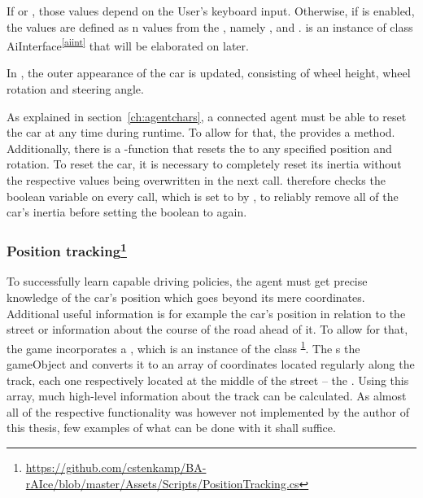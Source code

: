 If  or , those values depend on the User's keyboard input. Otherwise, if  is enabled, the values are defined as n values from the , namely ,  and .  is an instance of class AiInterface\textsuperscript{\ref{aiint}} that will be elaborated on later.

In , the outer appearance of the car is updated, consisting of wheel height, wheel rotation and steering angle.

As explained in section~\ref{ch:agentchars}, a connected agent must be able to reset the car at any time during runtime. To allow for that, the  provides a  method. Additionally, there is a -function that resets the  to any specified position and rotation. To reset the car, it is necessary to completely reset its inertia without the respective values being overwritten in the next  call.  therefore checks the boolean variable  on every call, which is set to  by , to reliably remove all of the car's inertia before setting the boolean to  again.



\subsubsection{Position tracking\footnote{\label{fn:postrack}\url{https://github.com/cstenkamp/BA-rAIce/blob/master/Assets/Scripts/PositionTracking.cs}}}
\label{sec:positiontracking}

To successfully learn capable driving policies, the agent must get precise knowledge of the car's position which goes beyond its mere coordinates. Additional useful information is for example the car's position in relation to the street or information about the course of the road ahead of it. To allow for that, the game incorporates a , which is an instance of the class \textsuperscript{\ref{fn:postrack}}. The  s the gameObject  and converts it to an array of coordinates located regularly along the track, each one respectively located at the middle of the street -- the . Using this array, much high-level information about the track can be calculated. As almost all of the respective functionality was however not implemented by the author of this thesis, few examples of what can be done with it shall suffice.

